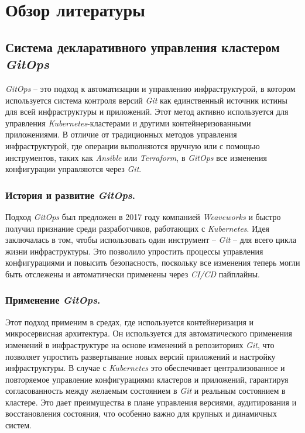\section{Обзор литературы}
\subsection{Система декларативного управления кластером \textit{GitOps}}
\label{sec:gitops}
\textit{GitOps} -- это подход к автоматизации и управлению инфраструктурой, в котором используется система контроля версий \textit{Git} как единственный источник истины для всей инфраструктуры и приложений. Этот метод активно используется для управления \textit{Kubernetes}-кластерами и другими контейнеризованными приложениями. В отличие от традиционных методов управления инфраструктурой, где операции выполняются вручную или с помощью инструментов, таких как \textit{Ansible} или \textit{Terraform}, в \textit{GitOps} все изменения конфигурации управляются через \textit{Git}. 

\subsubsection{История и развитие \textit{GitOps}.}
Подход \textit{GitOps} был предложен в 2017 году компанией \textit{Weaveworks} и быстро получил признание среди разработчиков, работающих с \textit{Kubernetes}. Идея заключалась в том, чтобы использовать один инструмент -- \textit{Git} -- для всего цикла жизни инфраструктуры. Это позволило упростить процессы управления конфигурациями и повысить безопасность, поскольку все изменения теперь могли быть отслежены и автоматически применены через \textit{CI/CD} пайплайны.

\subsubsection{Применение \textit{GitOps}.}
Этот подход применим в средах, где используется контейнеризация и микросервисная архитектура. Он используется для автоматического применения изменений в инфраструктуре на основе изменений в репозиториях \textit{Git}, что позволяет упростить развертывание новых версий приложений и настройку инфраструктуры. В случае с \textit{Kubernetes} это обеспечивает централизованное и повторяемое управление конфигурациями кластеров и приложений, гарантируя согласованность между желаемым состоянием в \textit{Git} и реальным состоянием в кластере. Это дает преимущества в плане управления версиями, аудитирования и восстановления состояния, что особенно важно для крупных и динамичных систем.

